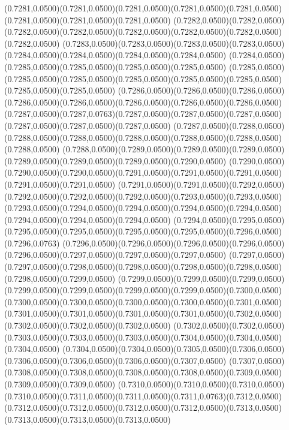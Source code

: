 (0.7281,0.0500)(0.7281,0.0500)(0.7281,0.0500)(0.7281,0.0500)(0.7281,0.0500)(0.7281,0.0500)(0.7281,0.0500)(0.7281,0.0500)
(0.7282,0.0500)(0.7282,0.0500)(0.7282,0.0500)(0.7282,0.0500)(0.7282,0.0500)(0.7282,0.0500)(0.7282,0.0500)(0.7282,0.0500)
(0.7283,0.0500)(0.7283,0.0500)(0.7283,0.0500)(0.7283,0.0500)(0.7284,0.0500)(0.7284,0.0500)(0.7284,0.0500)(0.7284,0.0500)
(0.7284,0.0500)(0.7285,0.0500)(0.7285,0.0500)(0.7285,0.0500)(0.7285,0.0500)
\PST@Solid(0.7285,0.0500)(0.7285,0.0500)(0.7285,0.0500)(0.7285,0.0500)(0.7285,0.0500)(0.7285,0.0500)(0.7285,0.0500)(0.7285,0.0500)
(0.7286,0.0500)(0.7286,0.0500)(0.7286,0.0500)(0.7286,0.0500)(0.7286,0.0500)(0.7286,0.0500)(0.7286,0.0500)(0.7286,0.0500)
(0.7287,0.0500)(0.7287,0.0763)(0.7287,0.0500)(0.7287,0.0500)(0.7287,0.0500)(0.7287,0.0500)(0.7287,0.0500)(0.7287,0.0500)
(0.7287,0.0500)(0.7288,0.0500)(0.7288,0.0500)(0.7288,0.0500)(0.7288,0.0500)(0.7288,0.0500)(0.7288,0.0500)(0.7288,0.0500)
(0.7288,0.0500)(0.7289,0.0500)(0.7289,0.0500)(0.7289,0.0500)(0.7289,0.0500)(0.7289,0.0500)(0.7289,0.0500)(0.7290,0.0500)
(0.7290,0.0500)(0.7290,0.0500)(0.7290,0.0500)(0.7291,0.0500)(0.7291,0.0500)(0.7291,0.0500)(0.7291,0.0500)(0.7291,0.0500)
(0.7291,0.0500)(0.7291,0.0500)(0.7292,0.0500)(0.7292,0.0500)(0.7292,0.0500)(0.7292,0.0500)(0.7293,0.0500)(0.7293,0.0500)
(0.7293,0.0500)(0.7294,0.0500)(0.7294,0.0500)(0.7294,0.0500)(0.7294,0.0500)(0.7294,0.0500)(0.7294,0.0500)(0.7294,0.0500)
(0.7294,0.0500)(0.7295,0.0500)(0.7295,0.0500)(0.7295,0.0500)(0.7295,0.0500)(0.7295,0.0500)(0.7296,0.0500)(0.7296,0.0763)
(0.7296,0.0500)(0.7296,0.0500)(0.7296,0.0500)(0.7296,0.0500)(0.7296,0.0500)(0.7297,0.0500)(0.7297,0.0500)(0.7297,0.0500)
(0.7297,0.0500)(0.7297,0.0500)(0.7298,0.0500)(0.7298,0.0500)(0.7298,0.0500)(0.7298,0.0500)(0.7298,0.0500)(0.7299,0.0500)
(0.7299,0.0500)(0.7299,0.0500)(0.7299,0.0500)(0.7299,0.0500)(0.7299,0.0500)(0.7299,0.0500)(0.7299,0.0500)(0.7300,0.0500)
(0.7300,0.0500)(0.7300,0.0500)(0.7300,0.0500)(0.7300,0.0500)(0.7301,0.0500)
\PST@Solid(0.7301,0.0500)(0.7301,0.0500)(0.7301,0.0500)(0.7301,0.0500)(0.7302,0.0500)(0.7302,0.0500)(0.7302,0.0500)(0.7302,0.0500)
(0.7302,0.0500)(0.7302,0.0500)(0.7303,0.0500)(0.7303,0.0500)(0.7303,0.0500)(0.7304,0.0500)(0.7304,0.0500)(0.7304,0.0500)
(0.7304,0.0500)(0.7304,0.0500)(0.7305,0.0500)(0.7306,0.0500)(0.7306,0.0500)(0.7306,0.0500)(0.7306,0.0500)(0.7307,0.0500)
(0.7307,0.0500)(0.7308,0.0500)(0.7308,0.0500)(0.7308,0.0500)(0.7308,0.0500)(0.7309,0.0500)(0.7309,0.0500)(0.7309,0.0500)
(0.7310,0.0500)(0.7310,0.0500)(0.7310,0.0500)(0.7310,0.0500)(0.7311,0.0500)(0.7311,0.0500)(0.7311,0.0763)(0.7312,0.0500)
(0.7312,0.0500)(0.7312,0.0500)(0.7312,0.0500)(0.7312,0.0500)(0.7313,0.0500)(0.7313,0.0500)(0.7313,0.0500)(0.7313,0.0500)
